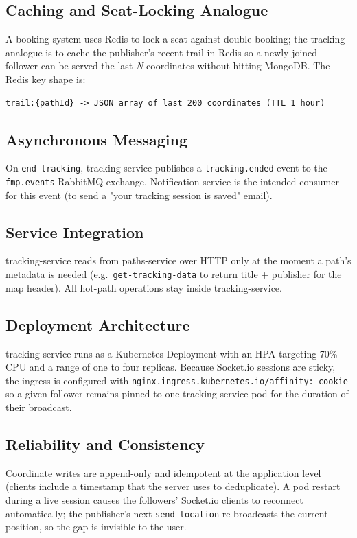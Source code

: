 \documentclass[11pt,a4paper]{article}
\begin{document}
\subsection{Caching and Seat-Locking Analogue}
A booking-system uses Redis to lock a seat against double-booking;
the tracking analogue is to cache the publisher's recent trail in
Redis so a newly-joined follower can be served the last \emph{N}
coordinates without hitting MongoDB.  The Redis key shape is:

\begin{lstlisting}
trail:{pathId} -> JSON array of last 200 coordinates (TTL 1 hour)
\end{lstlisting}

\subsection{Asynchronous Messaging}
On \texttt{end-tracking}, tracking-service publishes a
\texttt{tracking.ended} event to the \texttt{fmp.events} RabbitMQ
exchange.  Notification-service is the intended consumer for this
event (to send a "your tracking session is saved" email).

\subsection{Service Integration}
tracking-service reads from paths-service over HTTP only at the
moment a path's metadata is needed (e.g.\ \texttt{get-tracking-data}
to return title + publisher for the map header).  All hot-path
operations stay inside tracking-service.

\subsection{Deployment Architecture}
tracking-service runs as a Kubernetes Deployment with an HPA targeting
70\% CPU and a range of one to four replicas.  Because Socket.io
sessions are sticky, the ingress is configured with
\texttt{nginx.ingress.kubernetes.io/affinity: cookie} so a given
follower remains pinned to one tracking-service pod for the duration
of their broadcast.

\subsection{Reliability and Consistency}
Coordinate writes are append-only and idempotent at the application
level (clients include a timestamp that the server uses to
deduplicate).  A pod restart during a live session causes the
followers' Socket.io clients to reconnect automatically; the
publisher's next \texttt{send-location} re-broadcasts the current
position, so the gap is invisible to the user.
\end{document}
